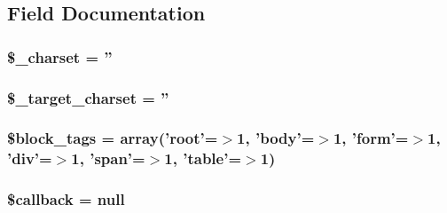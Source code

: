 \subsection{Field Documentation}
\hypertarget{classsimple__html__dom_ad6b00a32790b456a2f1668b2010a262e}{
\subsubsection[{\$\+\_\+charset}]{\setlength{\rightskip}{0pt plus 5cm}\$\+\_\+charset = ''}}\label{classsimple__html__dom_ad6b00a32790b456a2f1668b2010a262e}
\hypertarget{classsimple__html__dom_a8f23f043ea2af2e56d97bebf17347f23}{
\subsubsection[{\$\+\_\+target\+\_\+charset}]{\setlength{\rightskip}{0pt plus 5cm}\$\+\_\+target\+\_\+charset = ''}}\label{classsimple__html__dom_a8f23f043ea2af2e56d97bebf17347f23}
\hypertarget{classsimple__html__dom_ac513b8dc3142f886d0609b7893fe6026}{
\subsubsection[{\$block\+\_\+tags}]{\setlength{\rightskip}{0pt plus 5cm}\$block\+\_\+tags = array('root'=$>$1, 'body'=$>$1, 'form'=$>$1, 'div'=$>$1, 'span'=$>$1, 'table'=$>$1)\hspace{0.3cm}{\ttfamily [protected]}}}\label{classsimple__html__dom_ac513b8dc3142f886d0609b7893fe6026}
\hypertarget{classsimple__html__dom_abc7c2ac0d93d22f71221e8b60512c860}{
\subsubsection[{\$callback}]{\setlength{\rightskip}{0pt plus 5cm}\$callback = null}}\label{classsimple__html__dom_abc7c2ac0d93d22f71221e8b60512c860}
